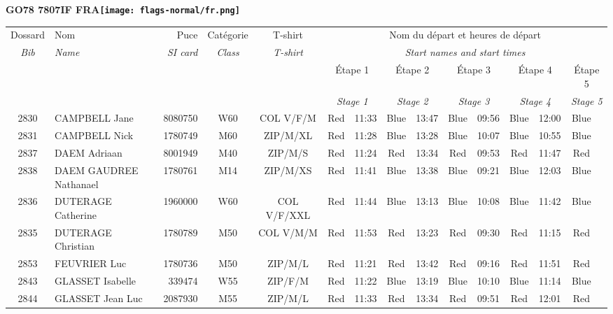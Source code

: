 \documentclass{report}
\begin{document}
\newpage
  \Huge \centering \bfseries GO78 7807IF FRA\normalfont \footnotesize \sffamily \hfill \texttt{[image: flags-normal/fr.png]} \newline 
  \begin{longtable}{|c|l|r|c|c|*{5}{cc|}}
    Dossard & Nom  & Puce    & Catégorie & T-shirt & \multicolumn{10}{c|}{Nom du départ et heures de départ} \\
    \itshape Bib     & \itshape Name & \itshape SI card & \itshape Class  & \itshape  T-shirt  & \multicolumn{10}{c|}{\itshape Start names and start times} \\
    \hline
    & & & & & \multicolumn{2}{c|}{Étape 1} & \multicolumn{2}{c|}{Étape 2} & \multicolumn{2}{c|}{Étape 3} & \multicolumn{2}{c|}{Étape 4} & \multicolumn{2}{c|}{Étape 5} \\
    & & & & & \multicolumn{2}{c|}{\itshape Stage 1} & \multicolumn{2}{c|}{\itshape Stage 2} & \multicolumn{2}{c|}{\itshape Stage 3} & \multicolumn{2}{c|}{\itshape Stage 4} & \multicolumn{2}{c|}{\itshape Stage 5} \\
    \hline
    2830 & CAMPBELL Jane & 8080750 & W60 & COL V/F/M & Red & 11:33 & Blue & 13:47 & Blue & 09:56 & Blue & 12:00 & Blue &  \\
    2831 & CAMPBELL Nick & 1780749 & M60 & ZIP/M/XL & Red & 11:28 & Blue & 13:28 & Blue & 10:07 & Blue & 10:55 & Blue &  \\
    2837 & DAEM Adriaan & 8001949 & M40 & ZIP/M/S & Red & 11:24 & Red & 13:34 & Red & 09:53 & Red & 11:47 & Red &  \\
    2838 & DAEM GAUDREE Nathanael & 1780761 & M14 & ZIP/M/XS & Red & 11:41 & Blue & 13:38 & Blue & 09:21 & Blue & 12:03 & Blue &  \\
    2836 & DUTERAGE Catherine & 1960000 & W60 & COL V/F/XXL & Red & 11:44 & Blue & 13:13 & Blue & 10:08 & Blue & 11:42 & Blue &  \\
    2835 & DUTERAGE Christian & 1780789 & M50 & COL V/M/M & Red & 11:53 & Red & 13:23 & Red & 09:30 & Red & 11:15 & Red &  \\
    2853 & FEUVRIER Luc & 1780736 & M50 & ZIP/M/L & Red & 11:21 & Red & 13:42 & Red & 09:16 & Red & 11:51 & Red &  \\
    2843 & GLASSET Isabelle & 339474 & W55 & ZIP/F/M & Red & 11:22 & Blue & 13:19 & Blue & 10:10 & Blue & 11:14 & Blue &  \\
    2844 & GLASSET Jean Luc & 2087930 & M55 & ZIP/M/L & Red & 11:33 & Red & 13:34 & Red & 09:51 & Red & 12:01 & Red &  \\

\end{longtable}
\end{document}
